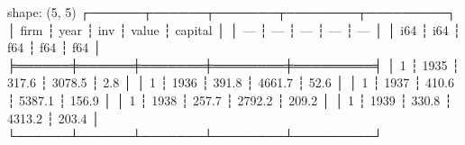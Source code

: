 shape: (5, 5)
┌──────┬──────┬───────┬────────┬─────────┐
│ firm ┆ year ┆ inv   ┆ value  ┆ capital │
│ ---  ┆ ---  ┆ ---   ┆ ---    ┆ ---     │
│ i64  ┆ i64  ┆ f64   ┆ f64    ┆ f64     │
╞══════╪══════╪═══════╪════════╪═════════╡
│ 1    ┆ 1935 ┆ 317.6 ┆ 3078.5 ┆ 2.8     │
│ 1    ┆ 1936 ┆ 391.8 ┆ 4661.7 ┆ 52.6    │
│ 1    ┆ 1937 ┆ 410.6 ┆ 5387.1 ┆ 156.9   │
│ 1    ┆ 1938 ┆ 257.7 ┆ 2792.2 ┆ 209.2   │
│ 1    ┆ 1939 ┆ 330.8 ┆ 4313.2 ┆ 203.4   │
└──────┴──────┴───────┴────────┴─────────┘
